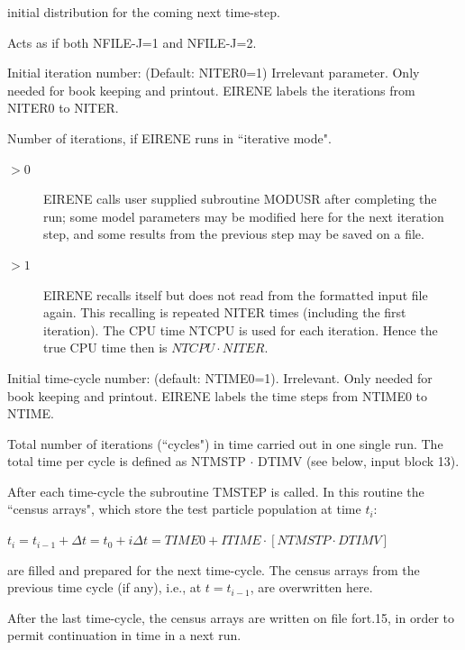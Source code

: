 \begin{description}
\begin{description}
                initial distribution for the coming next time-step.
          \item [J = 3 ] Acts as if both NFILE-J=1 and NFILE-J=2.
        \end{description}
  \item[NITER0] Initial iteration number: (Default: NITER0=1) Irrelevant
        parameter.
        Only needed for book keeping and printout.
        EIRENE labels the iterations from NITER0 to NITER.
  \item[NITER] Number of iterations, if EIRENE runs in ``iterative mode".
        \begin{description}
          \item[$> 0$] EIRENE calls user supplied subroutine MODUSR after completing the
                run; some model parameters may be modified here for the next iteration step,
                and some results from the previous step may be saved on a file.
          \item[$> 1$] EIRENE recalls itself but does not read from the formatted input
                file again.
                This recalling is repeated NITER times (including the first iteration).
                The CPU time NTCPU is used for each iteration.
                Hence the true CPU time then is $ NTCPU \cdot NITER $.
        \end{description}
  \item[NTIME0] Initial time-cycle number: (default: NTIME0=1).
        Irrelevant.
        Only needed for book keeping and printout.
        EIRENE labels the time steps from NTIME0 to NTIME.
  \item[NTIME] Total number of iterations (``cycles") in time carried out in one
        single run.
        The total time per cycle is defined as NTMSTP $\cdot$ DTIMV (see below, input
        block 13).

        After each time-cycle the subroutine TMSTEP is called.
        In this routine the ``census arrays", which store the test particle population
        at time $t_i$:

        $t_{i} = t_{i-1} + \Delta t = t_0 + i \Delta t = TIME0 + ITIME \cdot [NTMSTP
            \cdot DTIMV]$

        are filled and prepared for the next time-cycle.
        The census arrays from the previous time cycle (if any), i.e., at $t =
          t_{i-1}$, are overwritten here.

        After the last time-cycle, the census arrays are written on file fort.15, in
        order to permit continuation in time in a next run.


\end{description}
